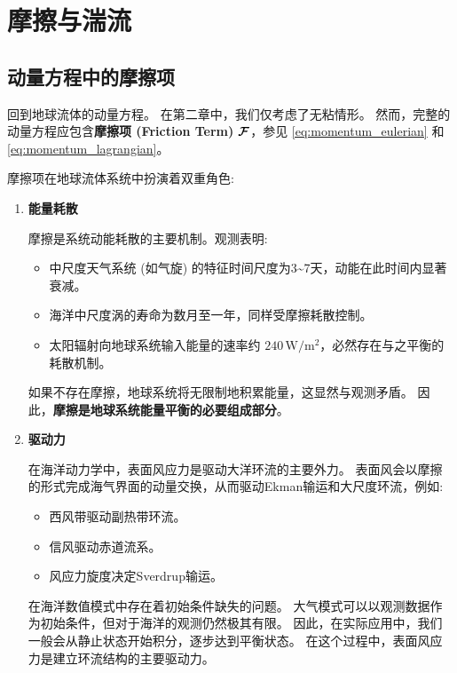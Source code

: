 \section{摩擦与湍流}

\subsection{动量方程中的摩擦项}

回到地球流体的动量方程。
在第二章中，我们仅考虑了无粘情形。
然而，完整的动量方程应包含\textbf{摩擦项 (Friction Term)} $\bm{\mathcal{F}}$，参见 \eqref{eq:momentum_eulerian} 和 \eqref{eq:momentum_lagrangian}。

摩擦项在地球流体系统中扮演着双重角色:
\begin{enumerate}
    \item \textbf{能量耗散}

    摩擦是系统动能耗散的主要机制。观测表明:
    \begin{itemize}
        \item 中尺度天气系统 (如气旋) 的特征时间尺度为3\textasciitilde7天，动能在此时间内显著衰减。
        \item 海洋中尺度涡的寿命为数月至一年，同样受摩擦耗散控制。
        \item 太阳辐射向地球系统输入能量的速率约 $240\,\mathrm{W/m^2}$，必然存在与之平衡的耗散机制。
    \end{itemize}

    如果不存在摩擦，地球系统将无限制地积累能量，这显然与观测矛盾。
    因此，\textbf{摩擦是地球系统能量平衡的必要组成部分}。

    \item \textbf{驱动力}

    在海洋动力学中，表面风应力是驱动大洋环流的主要外力。
    表面风会以摩擦的形式完成海气界面的动量交换，从而驱动Ekman输运和大尺度环流，例如:
    \begin{itemize}
        \item 西风带驱动副热带环流。
        \item 信风驱动赤道流系。
        \item 风应力旋度决定Sverdrup输运。
    \end{itemize}

    在海洋数值模式中存在着初始条件缺失的问题。
    大气模式可以以观测数据作为初始条件，但对于海洋的观测仍然极其有限。
    因此，在实际应用中，我们一般会从静止状态开始积分，逐步达到平衡状态。
    在这个过程中，表面风应力是建立环流结构的主要驱动力。
\end{enumerate}

